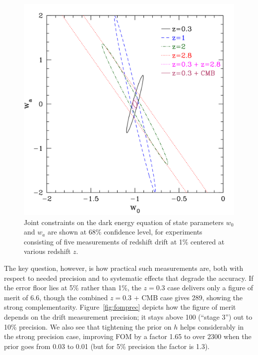\documentclass[preprint2, 10pt]{aastex}
\begin{document}
{\begin{figure}[!htbp] 
   \centering
  \includegraphics[width=\columnwidth]{w0wazpluscmb.pdf}
\caption{Joint constraints on the dark energy equation of state parameters 
$w_0$ and $w_a$ are shown at 68\% confidence level, for experiments 
consisting of five measurements of redshift drift at 1\% centered at 
various redshift $z$. 
} 
\label{fig:fisher} 
\end{figure}


The key question, however, is how practical such measurements are, both 
with respect to needed precision and to systematic effects that degrade 
the accuracy. If the error floor lies at 5\% rather than 1\%, the $z=0.3$ 
case delivers only a figure of merit of 6.6, though the combined $z=0.3$ + 
CMB case gives 289, showing the strong complementarity. 
Figure~\ref{fig:fomprec} depicts how the figure of merit depends on the 
drift measurement precision; it stays above 100 (``stage 3'') out to 10\% 
precision. We also see that tightening the prior on $h$ helps considerably 
in the strong precision case, improving FOM by a factor 1.65 to over 2300 
when the prior goes from 0.03 to 0.01 (but for 5\% precision the factor is 
1.3). 


}
\end{document}
